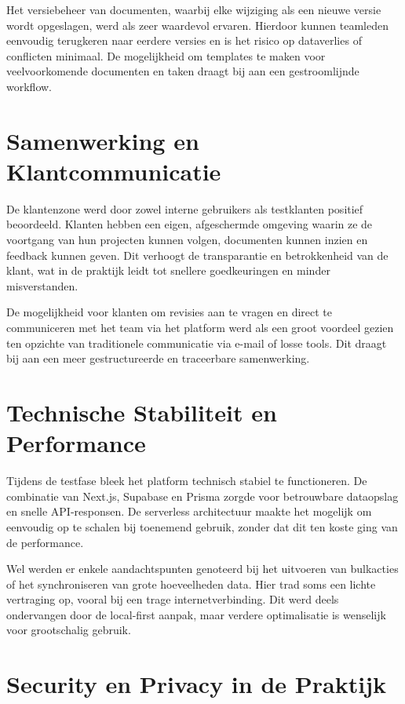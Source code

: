 Het versiebeheer van documenten, waarbij elke wijziging als een nieuwe versie wordt opgeslagen, werd als zeer waardevol ervaren. Hierdoor kunnen teamleden eenvoudig terugkeren naar eerdere versies en is het risico op dataverlies of conflicten minimaal. De mogelijkheid om templates te maken voor veelvoorkomende documenten en taken draagt bij aan een gestroomlijnde workflow.

\section{Samenwerking en Klantcommunicatie}
\label{sec:samenwerking-klant}

De klantenzone werd door zowel interne gebruikers als testklanten positief beoordeeld. Klanten hebben een eigen, afgeschermde omgeving waarin ze de voortgang van hun projecten kunnen volgen, documenten kunnen inzien en feedback kunnen geven. Dit verhoogt de transparantie en betrokkenheid van de klant, wat in de praktijk leidt tot snellere goedkeuringen en minder misverstanden.

De mogelijkheid voor klanten om revisies aan te vragen en direct te communiceren met het team via het platform werd als een groot voordeel gezien ten opzichte van traditionele communicatie via e-mail of losse tools. Dit draagt bij aan een meer gestructureerde en traceerbare samenwerking.

\section{Technische Stabiliteit en Performance}
\label{sec:technische-stabiliteit}

Tijdens de testfase bleek het platform technisch stabiel te functioneren. De combinatie van Next.js, Supabase en Prisma zorgde voor betrouwbare dataopslag en snelle API-responsen. De serverless architectuur maakte het mogelijk om eenvoudig op te schalen bij toenemend gebruik, zonder dat dit ten koste ging van de performance.

Wel werden er enkele aandachtspunten genoteerd bij het uitvoeren van bulkacties of het synchroniseren van grote hoeveelheden data. Hier trad soms een lichte vertraging op, vooral bij een trage internetverbinding. Dit werd deels ondervangen door de local-first aanpak, maar verdere optimalisatie is wenselijk voor grootschalig gebruik.

\section{Security en Privacy in de Praktijk}
\label{sec:security-privacy-analyse}

